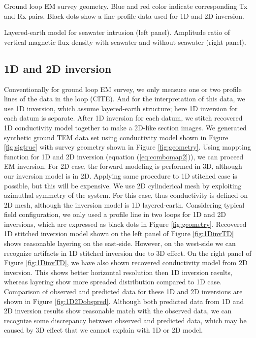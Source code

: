 \documentclass{segabs}
\begin{document}
{Ground loop EM survey geometry. Blue and red color indicate corresponding Tx and Rx pairs. Black dots show a line profile data used for 1D and 2D inversion. }

{Layered-earth model for seawater intrusion (left panel). Amplitude ratio of vertical magnetic flux density with seawater and without seawater (right panel).}

\subsection*{1D and 2D inversion}
Conventionally for ground loop EM survey, we only measure one or two profile lines of the data in the loop (CITE). And for the interpretation of this data, we use 1D inversion, which assume layered-earth structure; here 1D inversion for each datum is separate. After 1D inversion for each datum, we stitch recovered 1D conductivity model together to make a 2D-like section images. We generated synthetic ground TEM data set using conductivity model shown in Figure \ref{fig:sigtrue} with survey geometry shown in Figure \ref{fig:geometry}. Using mappting function for 1D and 2D inversion (equation (\ref{eq:combomap2})), we can proceed EM inversion. For 2D case, the forward modeling is performed in 3D, although our inversion model is in 2D. Applying same procedure to 1D stitched case is possible, but this will be expensive. We use 2D cylinderical mesh by exploiting azimuthal symmetry of the system. For this case, thus conductivity is defined on 2D mesh, although the inversion model is 1D layered-earth.
Considering typical field configuration, we only used a profile line in two loops for 1D and 2D inversions, which are expressed as black dots in Figure \ref{fig:geometry}.
Recovered 1D stitched inversion model shown on the left panel of Figure \ref{fig:1DinvTD} shows reasonable layering on the east-side. However, on the west-side we can recognize artifacts in 1D stitched inversion due to 3D effect. On the right panel of Figure \ref{fig:1DinvTD}, we have also shown recovered conductivity model from 2D inversion. This shows better horizontal resolution then 1D inversion results, whereas layering show more spreaded distribution compared to 1D case. Comparison of observed and predicted data for these 1D and 2D inversions are shown in Figure \ref{fig:1D2Dobspred}. Although both predicted data from 1D and 2D inversion results show reasonable match with the observed data, we can recognize some discrepancy between observed and predicted data, which may be caused by 3D effect that we cannot explain with 1D or 2D model.
\end{document}

